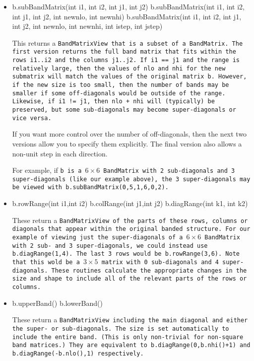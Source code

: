 \begin{itemize}
\item
\begin{tmvcode}
b.subBandMatrix(int i1, int i2, int j1, int j2)
b.subBandMatrix(int i1, int i2, int j1, int j2, int newnlo, int newnhi)
b.subBandMatrix(int i1, int i2, int j1, int j2, int newnlo, int newnhi, 
      int istep, int jstep)
\end{tmvcode}
This returns a \tt{BandMatrixView} that is a subset of a \tt{BandMatrix}.
The first version returns the full band matrix that fits within the rows
\tt{i1..i2} and the columns \tt{j1..j2}.  If \tt{i1 == j1} and the range is 
relatively large, then the values of \tt{nlo} and \tt{nhi} for the new 
submatrix will match the values of the original matrix \tt{b}.  However,
if the new size is too small, then the number of bands may be 
smaller if some off-diagonals would be outside of the range. 
Likewise, if \tt{i1 != j1}, then \tt{nlo + nhi} will (typically) be preserved, but some 
sub-diagonals may become super-diagonals or vice versa.

If you want more control over the number of off-diagonals, then
the next two versions allow you to specify them explicitly.  The final
version also allows a non-unit step in each direction.

For example, if \tt{b} is a $6 \times 6$ \tt{BandMatrix} with 2 sub-diagonals and 
3 super-diagonals
(like our example above), the 3 super-diagonals may be viewed with \tt{b.subBandMatrix(0,5,1,6,0,2)}.

\item
\begin{tmvcode}
b.rowRange(int i1,int i2)
b.colRange(int j1,int j2)
b.diagRange(int k1, int k2)
\end{tmvcode}
These return a \tt{BandMatrixView} of the parts of these rows,
columns or diagonals that
appear within the original banded structure.  For our example of viewing just
the super-diagonals of a $6 \times 6$ \tt{BandMatrix} with 2 sub- and 
3 super-diagonals, we
could instead use \tt{b.diagRange(1,4)}.  The last 3 rows would be \tt{b.rowRange(3,6)}.
Note that this wold be a $3 \times 5$ matrix with 0 sub-diagonals and 
4 super-diagonals.
These routines calculate the appropriate changes in the size and shape to include
all of the relevant parts of the rows or columns.

\item
\begin{tmvcode}
b.upperBand()
b.lowerBand()
\end{tmvcode}
These return a \tt{BandMatrixView} including the main diagonal and either the
super- or sub-diagonals.  The size
is set automatically to include the entire band.  (This is only
non-trivial for non-square band matrices.)  They are equivalent to
\tt{b.diagRange(0,b.nhi()+1)} and \tt{b.diagRange(-b.nlo(),1)} respectively.


\end{itemize}
